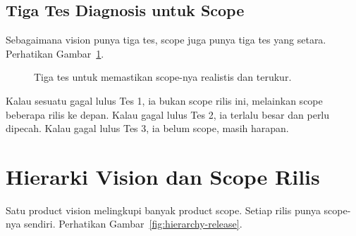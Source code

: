 \documentclass[11pt,a4paper]{article}
\begin{document}
\subsection{Tiga Tes Diagnosis untuk Scope}

Sebagaimana vision punya tiga tes, scope juga punya tiga tes yang setara. Perhatikan Gambar~\ref{fig:scope-tests}.

\begin{figure}[H]
	\centering
	\caption{Tiga tes untuk memastikan scope-nya realistis dan terukur.}
	\label{fig:scope-tests}
\end{figure}

Kalau sesuatu gagal lulus Tes 1, ia bukan scope rilis ini, melainkan scope beberapa rilis ke depan. Kalau gagal lulus Tes 2, ia terlalu besar dan perlu dipecah. Kalau gagal lulus Tes 3, ia belum scope, masih harapan.

\section{Hierarki Vision dan Scope Rilis}

Satu product vision melingkupi banyak product scope. Setiap rilis punya scope-nya sendiri. Perhatikan Gambar~\ref{fig:hierarchy-release}.
\end{document}
